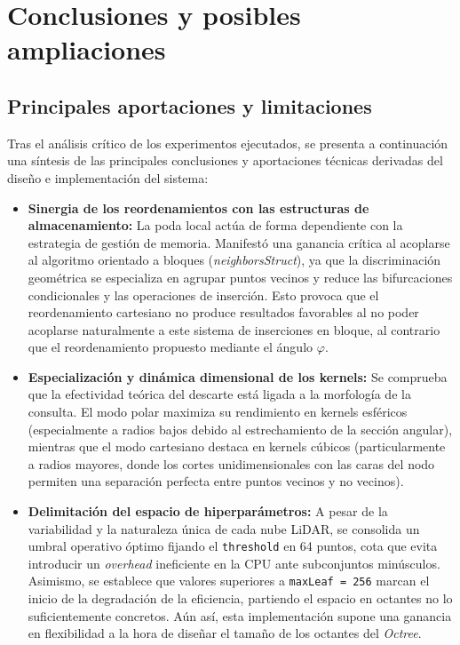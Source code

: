 \chapter{Conclusiones y posibles ampliaciones}


\section{Principales aportaciones y limitaciones}

Tras el análisis crítico de los experimentos ejecutados, se presenta a continuación una síntesis de las principales conclusiones y aportaciones técnicas derivadas del diseño e implementación del sistema:

\begin{itemize}
    \item \textbf{Sinergia de los reordenamientos con las estructuras de almacenamiento:} La poda local actúa de forma dependiente con la estrategia de gestión de memoria. Manifestó una ganancia crítica al acoplarse al algoritmo orientado a bloques (\textit{neighborsStruct}), ya que la discriminación geométrica se especializa en agrupar puntos vecinos y reduce las bifurcaciones condicionales y las operaciones de inserción. Esto provoca que el reordenamiento cartesiano no produce resultados favorables al no poder acoplarse naturalmente a este sistema de inserciones en bloque, al contrario que el reordenamiento propuesto mediante el ángulo $\varphi$.
    
    \item \textbf{Especialización y dinámica dimensional de los kernels:} Se comprueba que la efectividad teórica del descarte está ligada a la morfología de la consulta. El modo polar maximiza su rendimiento en kernels esféricos (especialmente a radios bajos debido al estrechamiento de la sección angular), mientras que el modo cartesiano destaca en kernels cúbicos (particularmente a radios mayores, donde los cortes unidimensionales con las caras del nodo permiten una separación perfecta entre puntos vecinos y no vecinos).
    
    \item \textbf{Delimitación del espacio de hiperparámetros:} A pesar de la variabilidad y la naturaleza única de cada nube LiDAR, se consolida un umbral operativo óptimo fijando el \texttt{threshold} en 64 puntos, cota que evita introducir un \textit{overhead} ineficiente en la CPU ante subconjuntos minúsculos. Asimismo, se establece que valores superiores a \texttt{maxLeaf = 256} marcan el inicio de la degradación de la eficiencia, partiendo el espacio en octantes no lo suficientemente concretos. Aún así, esta implementación supone una ganancia en flexibilidad a la hora de diseñar el tamaño de los octantes del \textit{Octree}.
    

\end{itemize}
